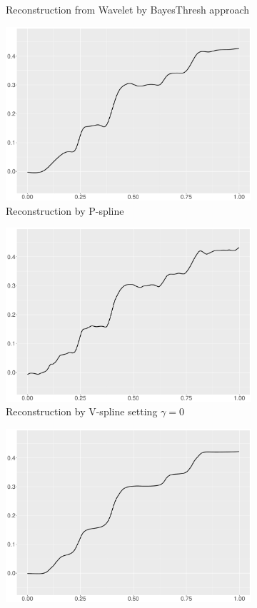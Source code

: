 \begin{figure}
\begin{subfigure}{0.45\textwidth}
    \caption{Reconstruction from Wavelet by BayesThresh approach}
    \end{subfigure}
    \begin{subfigure}{0.45\textwidth}
    \centering
    \includegraphics[width=\linewidth,height=0.45\textwidth]{Chapters/02TractorSplineTheory/plot/ggplot/ggBumpsPSpline.pdf}
    \caption{Reconstruction by P-spline }
    \end{subfigure}
    \begin{subfigure}{0.45\textwidth}
    \centering
    \includegraphics[width=\linewidth,height=0.45\textwidth]{Chapters/02TractorSplineTheory/plot/ggplot/ggBumpsGamma.pdf}
    \caption{Reconstruction by V-spline setting $\gamma=0$}
    \end{subfigure}
  \begin{subfigure}{0.45\textwidth}
    \centering
    \includegraphics[width=\linewidth,height=0.45\textwidth]{Chapters/02TractorSplineTheory/plot/ggplot/ggBumpsTractorAPT.pdf}

\end{subfigure}
\end{figure}
